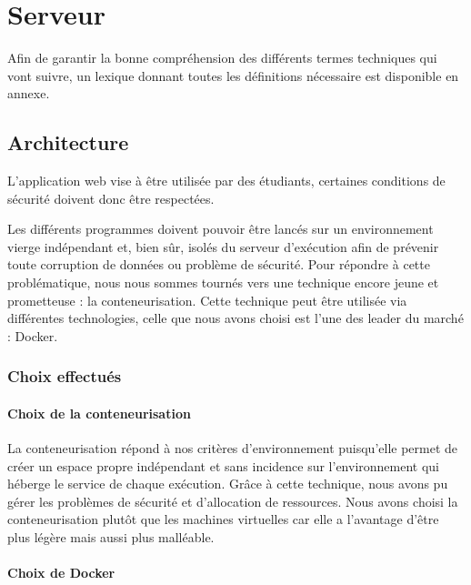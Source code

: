 \chapter{Serveur}

\par Afin de garantir la bonne compréhension des différents termes techniques qui vont suivre, un lexique donnant toutes les définitions nécessaire est disponible en annexe.

\section{Architecture}

\par L’application web vise à être utilisée par des étudiants, certaines conditions de sécurité doivent donc être respectées.
 
\par Les différents programmes doivent pouvoir être lancés sur un environnement vierge indépendant et, bien sûr, isolés du serveur d’exécution afin de prévenir toute corruption de données ou problème de sécurité. Pour répondre à cette problématique, nous nous sommes tournés vers une technique encore jeune et prometteuse : la conteneurisation. Cette technique peut être utilisée via différentes technologies, celle que nous avons choisi est l’une des leader du marché : Docker.

\subsection{Choix effectués}

\subsubsection{Choix de la conteneurisation}


\par La conteneurisation répond à nos critères d’environnement puisqu’elle permet de créer un espace propre indépendant et sans incidence sur l’environnement qui héberge le \gls{service} de chaque exécution. Grâce à cette technique, nous avons pu gérer les problèmes de sécurité et d’allocation de ressources. Nous avons choisi la conteneurisation plutôt que les machines virtuelles car elle a l’avantage d’être plus légère mais aussi plus malléable.  

\subsubsection{Choix de Docker}

